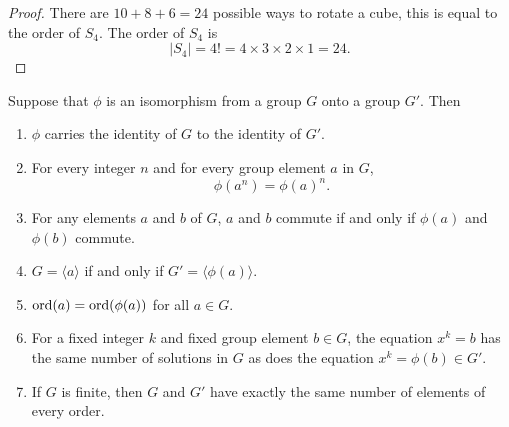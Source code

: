 \begin{proof}
    There are $10 + 8 + 6 = 24$ possible ways to rotate a cube, this is equal to the order of $S_4$. The order of $S_4$ is
    \[
        |S_4| = 4! = 4 \times 3 \times 2 \times 1 = 24.
    \]
\end{proof}

\begin{theorem}
    Suppose that $\phi$ is an isomorphism from a group $G$ onto a group $G'$. Then 
    \begin{enumerate}
        \item $\phi$ carries the identity of $G$ to the identity of $G'$.
        \item For every integer $n$ and for every group element $a$ in $G$,
        \[
            \phi(a^n) = \phi(a)^n.
        \]
        \item For any elements $a$ and $b$ of $G$, $a$ and $b$ commute if and only if $\phi(a)$ and $\phi(b)$ commute.
        \item $G = \langle a \rangle$ if and only if $G' = \langle \phi(a) \rangle$.
        \item $\operatorname{ord}(a) = \operatorname{ord}(\phi(a))$ for all $a \in G$.
        \item For a fixed integer $k$ and fixed group element $b \in G$, the equation $x^k = b$ has the same number of solutions 
        in $G$ as does the equation $x^k = \phi(b) \in G'$.
        \item If $G$ is finite, then $G$ and $G'$ have exactly the same number of elements of every order.
    \end{enumerate}
\end{theorem}
